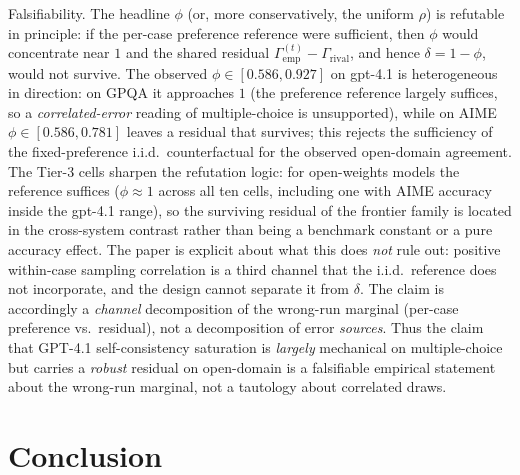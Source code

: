 \documentclass{article}
\newcommand{\agreementIndex}{\Gamma}
\begin{document}
Falsifiability. The headline $\phi$ (or, more conservatively, the
uniform $\rho$) is refutable in principle: if the per-case preference
reference were sufficient, then $\phi$ would concentrate near $1$ and the shared
residual $\agreementIndex_{\mathrm{emp}}^{(t)}-\agreementIndex_{\mathrm{rival}}$, and hence
$\delta=1-\phi$, would not survive. The observed
$\phi\in[0.586,0.927]$ on gpt-4.1 is heterogeneous in direction: on GPQA it
approaches
$1$ (the preference reference largely suffices, so a \emph{correlated-error}
reading of multiple-choice is unsupported), while on AIME
$\phi\in[0.586,0.781]$
leaves a residual that survives; this rejects the sufficiency of the
fixed-preference i.i.d.\ counterfactual for the observed open-domain
agreement. The Tier-3 cells sharpen
the refutation logic: for open-weights models the reference suffices
($\phi\approx1$ across all ten cells, including one with AIME accuracy
inside the gpt-4.1 range), so the surviving residual of the frontier
family is located in the cross-system contrast rather than being a benchmark
constant or a pure accuracy effect. The paper is explicit about what this does \emph{not} rule out: positive within-case sampling
correlation is a third channel that the i.i.d.\ reference does not
incorporate, and the design cannot separate it from $\delta$. The claim
is accordingly a \emph{channel} decomposition of the wrong-run marginal
(per-case preference vs.\ residual), not a decomposition of error
\emph{sources}. Thus the claim that GPT-4.1 self-consistency
saturation is \emph{largely} mechanical on multiple-choice but carries a
\emph{robust} residual on open-domain is a falsifiable
empirical statement about the wrong-run marginal, not a tautology about
correlated draws.

\section{Conclusion}
\end{document}
